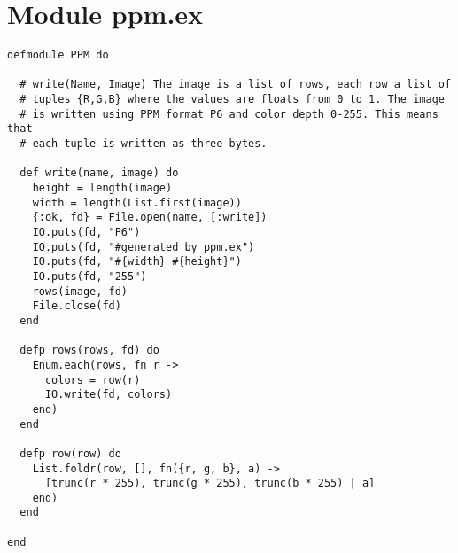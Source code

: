 \documentclass[a4paper,11pt]{article}
\begin{document}
\section{Module ppm.ex} \label{app:ppm}
\begin{verbatim}
defmodule PPM do

  # write(Name, Image) The image is a list of rows, each row a list of
  # tuples {R,G,B} where the values are floats from 0 to 1. The image
  # is written using PPM format P6 and color depth 0-255. This means that
  # each tuple is written as three bytes.

  def write(name, image) do
    height = length(image)
    width = length(List.first(image))
    {:ok, fd} = File.open(name, [:write])
    IO.puts(fd, "P6")
    IO.puts(fd, "#generated by ppm.ex")
    IO.puts(fd, "#{width} #{height}")
    IO.puts(fd, "255")
    rows(image, fd)
    File.close(fd)
  end

  defp rows(rows, fd) do
    Enum.each(rows, fn r ->
      colors = row(r)
      IO.write(fd, colors)
    end)
  end

  defp row(row) do
    List.foldr(row, [], fn({r, g, b}, a) ->
      [trunc(r * 255), trunc(g * 255), trunc(b * 255) | a]
    end)
  end

end

\end{verbatim}
\end{document}
